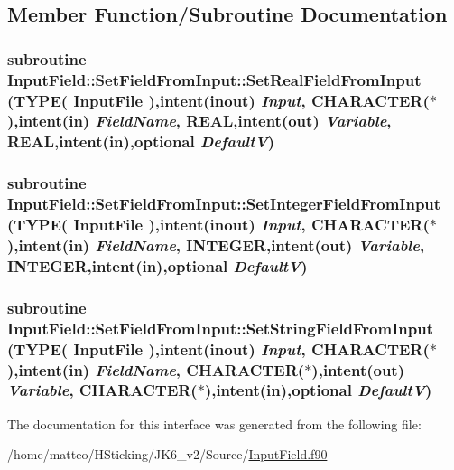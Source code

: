 \subsection{Member Function/Subroutine Documentation}
\hypertarget{interface_input_field_1_1_set_field_from_input_a93672a36fcf7b02f97f52accd2d36650}{
\subsubsection[{SetRealFieldFromInput}]{\setlength{\rightskip}{0pt plus 5cm}subroutine InputField::SetFieldFromInput::SetRealFieldFromInput (TYPE( {\bf InputFile} ),intent(inout) {\em Input}, \/  CHARACTER($\ast$),intent(in) {\em FieldName}, \/  REAL,intent(out) {\em Variable}, \/  REAL,intent(in),optional {\em DefaultV})}}
\label{interface_input_field_1_1_set_field_from_input_a93672a36fcf7b02f97f52accd2d36650}
\hypertarget{interface_input_field_1_1_set_field_from_input_a4e15a441aa157e6aa5602b5972afcdad}{
\subsubsection[{SetIntegerFieldFromInput}]{\setlength{\rightskip}{0pt plus 5cm}subroutine InputField::SetFieldFromInput::SetIntegerFieldFromInput (TYPE( {\bf InputFile} ),intent(inout) {\em Input}, \/  CHARACTER($\ast$),intent(in) {\em FieldName}, \/  INTEGER,intent(out) {\em Variable}, \/  INTEGER,intent(in),optional {\em DefaultV})}}
\label{interface_input_field_1_1_set_field_from_input_a4e15a441aa157e6aa5602b5972afcdad}
\hypertarget{interface_input_field_1_1_set_field_from_input_af5d724423ed22249a203879cb52da6b8}{
\subsubsection[{SetStringFieldFromInput}]{\setlength{\rightskip}{0pt plus 5cm}subroutine InputField::SetFieldFromInput::SetStringFieldFromInput (TYPE( {\bf InputFile} ),intent(inout) {\em Input}, \/  CHARACTER($\ast$),intent(in) {\em FieldName}, \/  CHARACTER($\ast$),intent(out) {\em Variable}, \/  CHARACTER($\ast$),intent(in),optional {\em DefaultV})}}
\label{interface_input_field_1_1_set_field_from_input_af5d724423ed22249a203879cb52da6b8}


The documentation for this interface was generated from the following file:\begin{DoxyCompactItemize}
\item 
/home/matteo/HSticking/JK6\_\-v2/Source/\hyperlink{_input_field_8f90}{InputField.f90}\end{DoxyCompactItemize}

